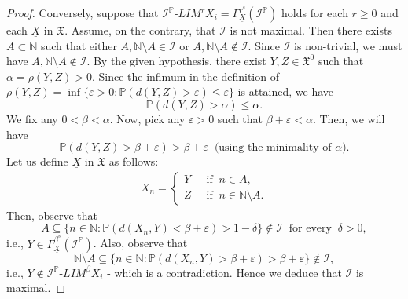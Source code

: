 \documentclass[reqno]{amsart}
\begin{document}
\begin{proof}
	Conversely, suppose that $\mathcal{I}^{\mathbb{P}}$-$LIM^rX_i=\Gamma^{r^s}_{\underline{X}}(\mathcal{I}^{\mathbb{P}})$ holds for each $r\geq 0$ and each $\underline{X}$ in $\mathfrak{X}$.
Assume, on the contrary, that $\mathcal{I}$ is not maximal. Then there exists $A\subset\mathbb{N}$ such that either $A,\mathbb{N}\setminus A\in\mathcal{I}$ or $A,\mathbb{N}\setminus A\notin\mathcal{I}$. Since $\mathcal{I}$ is non-trivial, we must have $A,\mathbb{N}\setminus A\notin\mathcal{I}$. By the given hypothesis, there exist $Y,Z\in \mathfrak{X}^0$ such that $\alpha=\rho(Y,Z)>0$. Since the infimum in the definition of $\rho(Y,Z)=\inf \{\varepsilon>0:\mathbb{P}(d(Y,Z)>\varepsilon)\leq\varepsilon\}$ is attained, we have 
$$
\mathbb{P}(d(Y,Z)>\alpha)\leq\alpha.
$$
We fix any $0<\beta<\alpha$. 
Now, pick any $\varepsilon>0$ such that $\beta+\varepsilon<\alpha$.
Then, we will have 
$$
\mathbb{P}(d(Y,Z)>\beta+\varepsilon)>\beta+\varepsilon~\mbox{ (using the minimality of $\alpha$)}.
$$
Let us define $\underline{X}$ in $\mathfrak{X}$ as follows:
\begin{align*}
	X_n=
	\begin{cases}
		Y~&\mbox{ if }~ n\in A,\\
		Z ~&\mbox{ if }~n\in \mathbb{N}\setminus A.
	\end{cases}
\end{align*}
Then, observe that 
$$
A\subseteq\{n\in\mathbb{N}:\mathbb{P}(d(X_n,Y)<\beta+\varepsilon)>1-\delta\}\notin\mathcal{I}~\mbox{ for every }~\delta>0,
$$
i.e., $Y\in\Gamma^{\beta^s}_{\underline{X}}(\mathcal{I}^{\mathbb{P}})$. Also, observe that 
$$
\mathbb{N}\setminus A\subseteq\{n\in\mathbb{N}:\mathbb{P}(d(X_n,Y)>\beta+\varepsilon)>\beta+\varepsilon\}\notin\mathcal{I},
$$
i.e., $Y\notin \mathcal{I}^{\mathbb{P}}$-$LIM^{\beta}X_i$ - which is a contradiction. Hence we deduce that $\mathcal{I}$ is maximal.
\end{proof}
	
	

	
	
\end{document}
